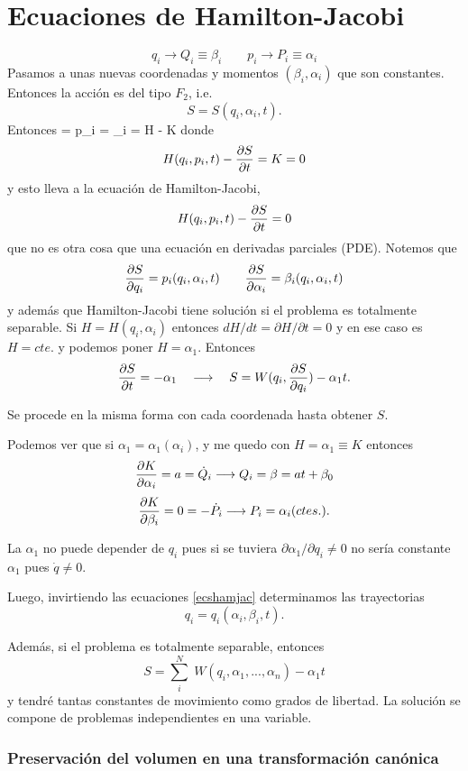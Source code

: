 \documentclass[10pt,oneside]{CBFT_book}
\begin{document}
\chapter{Ecuaciones de Hamilton-Jacobi}

\[
	q_i \longrightarrow Q_i \equiv \beta_i \qquad p_i \longrightarrow P_i \equiv \alpha_i
\]
Pasamos a unas nuevas coordenadas y momentos $(\beta_i,\alpha_i)$ que son constantes. Entonces
la acción es del tipo $F_2$, i.e.
\[
	S = S(q_i, \alpha_i, t).
\]
Entonces
\be
	 = p_i \qquad {} = \beta_i \qquad {} = H - K  
\label{ecshamjac}	
\ee
donde 
\[
	H(q_i,p_i,t) - \frac{\partial^{\hspace{-0.05em}} {S}}{\partial {t}^{\hspace{-0.05em}}} = K = 0
\]
y esto lleva a la ecuación de Hamilton-Jacobi,
\[
	H(q_i,p_i,t) - \frac{\partial^{\hspace{-0.05em}} {S}}{\partial {t}^{\hspace{-0.05em}}} = 0
\]
que no es otra cosa que una ecuación en derivadas parciales (PDE). Notemos que 
\[
	\frac{\partial^{\hspace{-0.05em}} {S}}{\partial {q_i}^{\hspace{-0.05em}}} = p_i(q_i,\alpha_i,t) \qquad \frac{\partial^{\hspace{-0.05em}} {S}}{\partial {\alpha_i}^{\hspace{-0.05em}}} = \beta_i(q_i,\alpha_i,t)
\]
y además que Hamilton-Jacobi tiene solución si el problema es totalmente separable.
Si $H=H(q_i,\alpha_i)$ entonces $dH/dt = \partial H/\partial t=0$ y en ese caso es $H=cte.$ y
podemos poner $H=\alpha_1$.
Entonces
\[
	\frac{\partial^{\hspace{-0.05em}} {S}}{\partial {t}^{\hspace{-0.05em}}} = -\alpha_1 \quad \longrightarrow \quad S=W(q_i,\frac{\partial^{\hspace{-0.05em}} {S}}{\partial {q_i}^{\hspace{-0.05em}}}) -\alpha_1 t .
\]

Se procede en la misma forma con cada coordenada hasta obtener $S$.

Podemos ver que si $\alpha_1 = \alpha_1(\alpha_i)$, y me quedo con $H=\alpha_1 \equiv K$ entonces
\[
	\frac{\partial^{\hspace{-0.05em}} {K}}{\partial {\alpha_i}^{\hspace{-0.05em}}} = a = \dot{Q}_i \longrightarrow Q_i = \beta = a t + \beta_0 
\]
\[
	\frac{\partial^{\hspace{-0.05em}} {K}}{\partial {\beta_i}^{\hspace{-0.05em}}} = 0 = -\dot{P}_i \longrightarrow P_i = \alpha_i (ctes.).
\]

La $\alpha_1$ no puede depender de $q_i$ pues si se tuviera $\partial \alpha_1 /\partial q_i \neq 0$ 
no sería constante $\alpha_1$ pues $\dot{q}\neq 0$.

Luego, invirtiendo las ecuaciones \eqref{ecshamjac} determinamos las trayectorias
\[
	q_i = q_i(\alpha_i, \beta_i, t).
\]

Además, si el problema es totalmente separable, entonces
\[
	S = \sum_i^N \; W(q_i, \alpha_1,...,\alpha_n) - \alpha_1 t
\]
y tendré tantas constantes de movimiento como grados de libertad. La solución se compone de problemas
independientes en una variable.

\subsection{Preservación del volumen en una transformación canónica}






\end{document}
